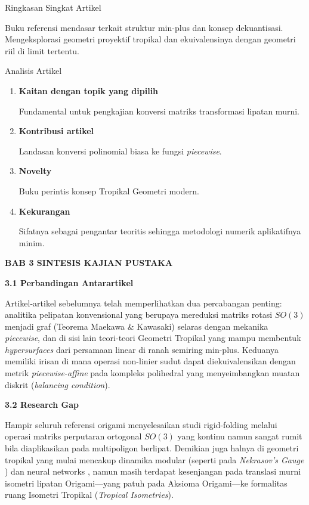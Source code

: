 \documentclass[12pt,a4paper]{article}
\begin{document}
\noindent Ringkasan Singkat Artikel\par
Buku referensi mendasar terkait struktur min-plus dan konsep dekuantisasi. Mengeksplorasi geometri proyektif tropikal dan ekuivalensinya dengan geometri riil di limit tertentu.

\noindent Analisis Artikel
\begin{enumerate}
      \item \textbf{Kaitan dengan topik yang dipilih}\par Fundamental untuk pengkajian konversi matriks transformasi lipatan murni.
      \item \textbf{Kontribusi artikel}\par Landasan konversi polinomial biasa ke fungsi \textit{piecewise}.
      \item \textbf{Novelty}\par Buku perintis konsep Tropikal Geometri modern.
      \item \textbf{Kekurangan}\par Sifatnya sebagai pengantar teoritis sehingga metodologi numerik aplikatifnya minim.
\end{enumerate}

\newpage
\noindent\textbf{\Large BAB 3 SINTESIS KAJIAN PUSTAKA}\par\bigskip

\noindent\textbf{\large 3.1 Perbandingan Antarartikel}\par
Artikel-artikel sebelumnya telah memperlihatkan dua percabangan penting: analitika pelipatan konvensional yang berupaya mereduksi matriks rotasi $SO(3)$ menjadi graf (Teorema Maekawa \& Kawasaki) selaras dengan mekanika \textit{piecewise}, dan di sisi lain teori-teori Geometri Tropikal yang mampu membentuk \textit{hypersurfaces} dari persamaan linear di ranah semiring min-plus. Keduanya memiliki irisan di mana operasi non-linier sudut dapat diekuivalensikan dengan metrik \textit{piecewise-affine} pada kompleks polihedral yang menyeimbangkan muatan diskrit (\textit{balancing condition}).\par

\noindent\textbf{\large 3.2 Research Gap}\par
Hampir seluruh referensi origami menyelesaikan studi rigid-folding melalui operasi matriks perputaran ortogonal $SO(3)$ yang kontinu namun sangat rumit bila diaplikasikan pada multipoligon berlipat. Demikian juga halnya di geometri tropikal yang mulai mencakup dinamika modular (seperti pada \textit{Nekrasov's Gauge} \cite{nekrasov2018geometry}) dan neural networks \cite{zhang2018tropical}, namun masih terdapat kesenjangan pada translasi murni isometri lipatan Origami—yang patuh pada Aksioma Origami—ke formalitas ruang Isometri Tropikal (\textit{Tropical Isometries}).\par
\end{document}
